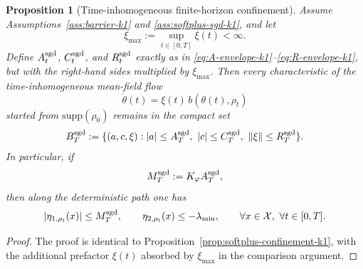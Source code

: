 \documentclass[11pt]{article}
\newtheorem{proposition}[theorem]{Proposition}
\theoremstyle{definition}
\newcommand{\supp}{\mathrm{supp}}
\newcommand{\norm}[1]{\left\lVert #1 \right\rVert}
\newcommand{\mc}[1]{\mathcal{#1}}
\begin{document}
\begin{proposition}[Time-inhomogeneous finite-horizon confinement]
\label{prop:sgd-confinement-k1}
Assume Assumptions~\ref{ass:barrier-k1} and \ref{ass:softplus-sgd-k1}, and let
\[
  \xi_{\max}:=\sup_{t\in[0,T]}\xi(t)<\infty.
\]
Define $A_t^{\rm sgd}$, $C_t^{\rm sgd}$, and $R_t^{\rm sgd}$ exactly as in
\eqref{eq:A-envelope-k1}--\eqref{eq:R-envelope-k1}, but with the right-hand
sides multiplied by $\xi_{\max}$. Then every characteristic of the
time-inhomogeneous mean-field flow
\[
  \dot\theta(t)=\xi(t)\,b(\theta(t),\rho_t)
\]
started from $\supp(\rho_0)$ remains in the compact set
\[
  B_T^{\rm sgd}
  :=
  \{(a,c,\xi): |a|\le A_T^{\rm sgd},\ |c|\le C_T^{\rm sgd},\ \norm{\xi}\le R_T^{\rm sgd}\}.
\]
In particular, if
\[
  M_T^{\rm sgd}:=K_\varphi A_T^{\rm sgd},
\]
then along the deterministic path one has
\[
  |\eta_{1,\rho_t}(x)|\le M_T^{\rm sgd},
  \qquad
  \eta_{2,\rho_t}(x)\le -\lambda_{\min},
  \qquad
  \forall x\in\mc{X},\ \forall t\in[0,T].
\]
\end{proposition}

\begin{proof}
The proof is identical to Proposition~\ref{prop:softplus-confinement-k1}, with
the additional prefactor $\xi(t)$ absorbed by $\xi_{\max}$ in the comparison
argument.
\end{proof}
\end{document}
